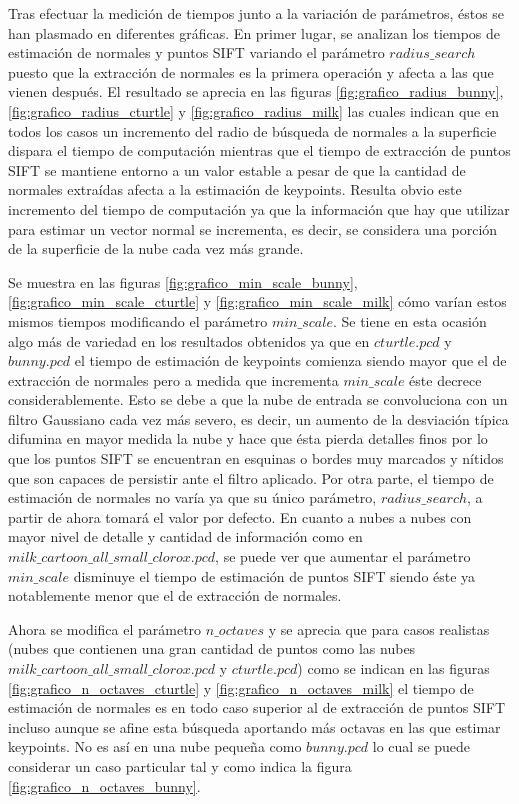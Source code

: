 Tras efectuar la medición de tiempos junto a la variación de parámetros, éstos se han plasmado en diferentes gráficas. En primer lugar, se analizan los tiempos de estimación de normales y puntos SIFT variando el parámetro $radius\_search$ puesto que la extracción de normales es la primera operación y afecta a las que vienen después. El resultado se aprecia en las figuras \ref{fig:grafico_radius_bunny}, \ref{fig:grafico_radius_cturtle} y \ref{fig:grafico_radius_milk} las cuales indican que en todos los casos un incremento del radio de búsqueda de normales a la superficie dispara el tiempo de computación mientras que el tiempo de extracción de puntos SIFT se mantiene entorno a un valor estable a pesar de que la cantidad de normales extraídas afecta a la estimación de keypoints. Resulta obvio este incremento del tiempo de computación ya que la información que hay que utilizar para estimar un vector normal se incrementa, es decir, se considera una porción de la superficie de la nube cada vez más grande.



Se muestra en las figuras \ref{fig:grafico_min_scale_bunny}, \ref{fig:grafico_min_scale_cturtle} y \ref{fig:grafico_min_scale_milk} cómo varían estos mismos tiempos modificando el parámetro $min\_scale$. Se tiene en esta ocasión algo más de variedad en los resultados obtenidos ya que en $cturtle.pcd$ y $bunny.pcd$ el tiempo de estimación de keypoints comienza siendo mayor que el de extracción de normales pero a medida que incrementa $min\_scale$ éste decrece considerablemente. Esto se debe a que la nube de entrada se convoluciona con un filtro Gaussiano cada vez más severo, es decir, un aumento de la desviación típica difumina en mayor medida la nube y hace que ésta pierda detalles finos por lo que los puntos SIFT se encuentran en esquinas o bordes muy marcados y nítidos que son capaces de persistir ante el filtro aplicado. Por otra parte, el tiempo de estimación de normales no varía ya que su único parámetro, $radius\_search$, a partir de ahora tomará el valor por defecto. En cuanto a nubes a nubes con mayor nivel de detalle y cantidad de información como en $milk\_cartoon\_all\_small\_clorox.pcd$, se puede ver que aumentar el parámetro $min\_scale$ disminuye el tiempo de estimación de puntos SIFT siendo éste ya notablemente menor que el de extracción de normales.




Ahora se modifica el parámetro $n\_octaves$ y se aprecia que para casos realistas (nubes que contienen una gran cantidad de puntos como las nubes $milk\_cartoon\_all\_small\_clorox.pcd$ y $cturtle.pcd$) como se indican en las figuras \ref{fig:grafico_n_octaves_cturtle} y \ref{fig:grafico_n_octaves_milk} el tiempo de estimación de normales es en todo caso superior al de extracción de puntos SIFT incluso aunque se afine esta búsqueda aportando  más octavas en las que estimar keypoints. No es así en una nube pequeña como $bunny.pcd$ lo cual se puede considerar un caso particular tal y como indica la figura \ref{fig:grafico_n_octaves_bunny}.



